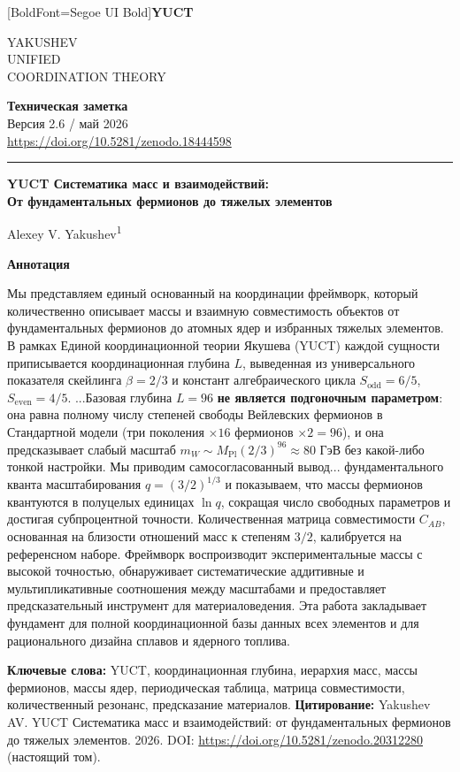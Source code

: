 \documentclass[11pt,a4paper]{article}
\newcommand{\makeheader}{%
	\noindent
	\begin{minipage}{0.17\textwidth}
		\raggedright
		{\fontspec{Segoe UI}[BoldFont=Segoe UI Bold]\bfseries\color{skyblue}\fontsize{46}{46}\selectfont YUCT}%
	\end{minipage}%
	\hspace{30pt}
	\begin{minipage}{0.32\textwidth}
		\raggedright
		{\sffamily\fontsize{11}{13}\selectfont YAKUSHEV\\ UNIFIED\\ COORDINATION THEORY}%
	\end{minipage}%
	\hfill
	\begin{minipage}{0.38\textwidth}
		\raggedleft
		{\sffamily\bfseries Техническая заметка}\\ 
		{\sffamily Версия 2.6 / май 2026}\\ 
		{\sffamily\footnotesize \url{https://doi.org/10.5281/zenodo.18444598}}%
	\end{minipage}
	\par\vspace{5pt}
	\noindent\textcolor{gold}{\rule{\textwidth}{1.6pt}}
	\par\vspace{0pt}
}
\begin{document}
	\thispagestyle{firstpage}
	\makeheader
	
	\vspace{0cm}
	{\LARGE\bfseries YUCT Систематика масс и взаимодействий:\\ 
		\Large От фундаментальных фермионов до тяжелых элементов \par}
	\vspace{0.2cm}
	
	{\large Alexey V. Yakushev\textsuperscript{1}} \\
	\vspace{0.0cm}
	
	{\color{darkblue}\textbf{\LARGE Аннотация}} \par
	{\large
		\noindent
		Мы представляем единый основанный на координации фреймворк, который количественно описывает массы и взаимную совместимость объектов от фундаментальных фермионов до атомных ядер и избранных тяжелых элементов. В рамках Единой координационной теории Якушева (YUCT) каждой сущности приписывается координационная глубина \(L\), выведенная из универсального показателя скейлинга \(\beta = 2/3\) и констант алгебраического цикла \(S_{\mathrm{odd}}=6/5\), \(S_{\mathrm{even}}=4/5\). ...Базовая глубина \(L=96\) \textbf{не является подгоночным параметром}: она равна полному числу степеней свободы Вейлевских фермионов в Стандартной модели (три поколения $\times 16$ фермионов $\times 2 = 96$), и она предсказывает слабый масштаб \(m_W \sim M_{\mathrm{Pl}}(2/3)^{96} \approx 80\) ГэВ без какой-либо тонкой настройки. Мы приводим самосогласованный вывод... фундаментального кванта масштабирования \(q = (3/2)^{1/3}\) и показываем, что массы фермионов квантуются в полуцелых единицах \(\ln q\), сокращая число свободных параметров и достигая субпроцентной точности. Количественная матрица совместимости \(C_{AB}\), основанная на близости отношений масс к степеням \(3/2\), калибруется на референсном наборе. Фреймворк воспроизводит экспериментальные массы с высокой точностью, обнаруживает систематические аддитивные и мультипликативные соотношения между масштабами и предоставляет предсказательный инструмент для материаловедения. Эта работа закладывает фундамент для полной координационной базы данных всех элементов и для рационального дизайна сплавов и ядерного топлива.}
	
	\vspace{0.1cm}
	\noindent
	{\color{darkblue}\textbf{Ключевые слова:}} YUCT, координационная глубина, иерархия масс, массы фермионов, массы ядер, периодическая таблица, матрица совместимости, количественный резонанс, предсказание материалов.
	\vspace{0.1cm}
	\noindent
	{\color{darkblue}\textbf{Цитирование:}} Yakushev AV. YUCT Систематика масс и взаимодействий: от фундаментальных фермионов до тяжелых элементов. 2026. DOI: \url{https://doi.org/10.5281/zenodo.20312280} (настоящий том).
	
\end{document}
